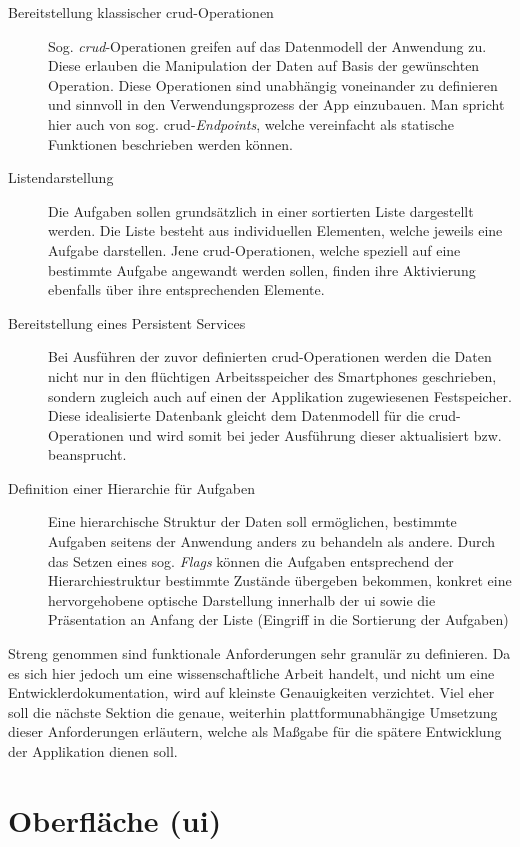 \begin{description}
    \item[Bereitstellung klassischer \acs{crud}-Operationen] Sog. \textit{\ac{crud}}-Operationen greifen auf das Datenmodell der Anwendung zu. Diese erlauben die Manipulation der Daten auf Basis der gewünschten Operation. Diese Operationen sind unabhängig voneinander zu definieren und sinnvoll in den Verwendungsprozess der App einzubauen. Man spricht hier auch von sog. \ac{crud}-\textit{Endpoints}, welche vereinfacht als statische Funktionen beschrieben werden können.
    \item[Listendarstellung] Die Aufgaben sollen grundsätzlich in einer sortierten Liste dargestellt werden. Die Liste besteht aus individuellen Elementen, welche jeweils eine Aufgabe darstellen. Jene \ac{crud}-Operationen, welche speziell auf eine bestimmte Aufgabe angewandt werden sollen, finden ihre Aktivierung ebenfalls über ihre entsprechenden Elemente.
    \item[Bereitstellung eines Persistent Services] Bei Ausführen der zuvor definierten \ac{crud}-Operationen werden die Daten nicht nur in den flüchtigen Arbeitsspeicher des Smartphones geschrieben, sondern zugleich auch auf einen der Applikation zugewiesenen Festspeicher. Diese idealisierte Datenbank gleicht dem Datenmodell für die \ac{crud}-Operationen und wird somit bei jeder Ausführung dieser aktualisiert bzw. beansprucht.
    \item[Definition einer Hierarchie für Aufgaben] Eine hierarchische Struktur der Daten soll ermöglichen, bestimmte Aufgaben seitens der Anwendung anders zu behandeln als andere. Durch das Setzen eines sog. \textit{Flags} können die Aufgaben entsprechend der Hierarchiestruktur bestimmte Zustände übergeben bekommen, konkret eine hervorgehobene optische Darstellung innerhalb der \ac{ui} sowie die Präsentation an Anfang der Liste (Eingriff in die Sortierung der Aufgaben)
\end{description}

Streng genommen sind funktionale Anforderungen sehr granulär zu definieren. Da es sich hier jedoch um eine wissenschaftliche Arbeit handelt, und nicht um eine Entwicklerdokumentation, wird auf kleinste Genauigkeiten verzichtet. Viel eher soll die nächste Sektion die genaue, weiterhin plattformunabhängige Umsetzung dieser Anforderungen erläutern, welche als Maßgabe für die spätere Entwicklung der Applikation dienen soll. 


\section{Oberfläche (\ac{ui})}

